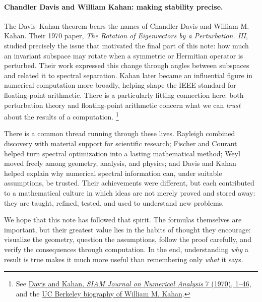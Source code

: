 \documentclass[14pt,letterpaper]{article}
\theoremstyle{plain}
\theoremstyle{definition}
\theoremstyle{remark}
\begin{document}
\paragraph{Chandler Davis and William Kahan: making stability precise.}
The Davis--Kahan theorem bears the names of Chandler Davis
and William M. Kahan. Their 1970 paper, \emph{The Rotation
of Eigenvectors by a Perturbation. III}, studied precisely
the issue that motivated the final part of this note: how
much an invariant subspace may rotate when a symmetric or
Hermitian operator is perturbed. Their work expressed this
change through angles between subspaces and related it to
spectral separation. Kahan later became an influential
figure in numerical computation more broadly, helping
shape the IEEE standard for floating-point arithmetic.
There is a particularly fitting connection here: both
perturbation theory and floating-point arithmetic concern
what we can \emph{trust} about the results of a computation.
\footnote{See
\href{https://epubs.siam.org/doi/abs/10.1137/0707001}{Davis and Kahan, \emph{SIAM Journal on Numerical Analysis} 7 (1970), 1--46},
and the
\href{https://www2.eecs.berkeley.edu/Faculty/Homepages/kahan.html}{UC Berkeley biography of William M. Kahan}.}

There is a common thread running through these lives.
Rayleigh combined discovery with material support for
scientific research; Fischer and Courant helped turn
spectral optimization into a lasting mathematical method;
Weyl moved freely among geometry, analysis, and physics;
and Davis and Kahan helped explain why numerical spectral
information can, under suitable assumptions, be trusted.
Their achievements were different, but each contributed to
a mathematical culture in which ideas are not merely
proved and stored away: they are taught, refined, tested,
and used to understand new problems.

We hope that this note has followed that spirit. The
formulas themselves are important, but their greatest
value lies in the habits of thought they encourage:
visualize the geometry, question the assumptions, follow
the proof carefully, and verify the consequences through
computation. In the end, understanding \emph{why} a result
is true makes it much more useful than remembering only
\emph{what} it says.



\end{document}
